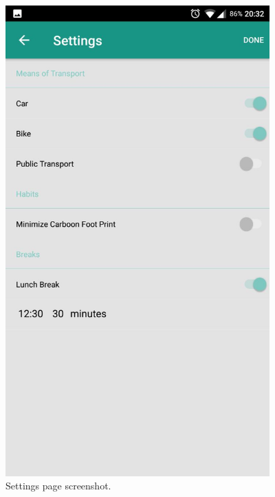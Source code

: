 \begin{figure}
	\centering
	\includegraphics[width=4in]{./screenshots/Androidsettings.jpg}
	\caption{Settings page screenshot.}
	\label{fig:droidsetting}
\end{figure}
